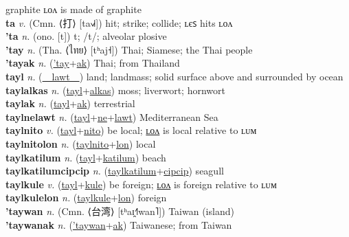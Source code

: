 graphite ʟᴏᴧ is made of graphite \label{tepatolon} \\
\textbf{ta} \textit{v.} (Cmn. ⟨打⟩ [ta˧˩˧])
hit; strike; collide; ʟєꜱ hits ʟᴏᴧ \label{ta} \\
\textbf{'ta} \textit{n.} (ono. [t])
t; /t/; alveolar plosive \label{'ta} \\
\textbf{'tay} \textit{n.} (Tha. ⟨ไทย⟩ [tʰaj˧])
Thai; Siamese; the Thai people \label{'tay} \\
\textbf{'tayak} \textit{n.} (\hyperref['tay]{'tay}+\hyperref[ak]{ak})
Thai; from Thailand \label{'tayak} \\
\textbf{tayl} \textit{n.} (\hyperref[lawt]{~~lawt~~})
land; landmass; solid surface above and surrounded by ocean \label{tayl} \\
\textbf{taylalkas} \textit{n.} (\hyperref[tayl]{tayl}+\hyperref[alkas]{alkas})
moss; liverwort; hornwort \label{taylalkas} \\
\textbf{taylak} \textit{n.} (\hyperref[tayl]{tayl}+\hyperref[ak]{ak})
terrestrial \label{taylak} \\
\textbf{taylnelawt} \textit{n.} (\hyperref[tayl]{tayl}+\hyperref[ne]{ne}+\hyperref[lawt]{lawt})
Mediterranean Sea \label{taylnelawt} \\
\textbf{taylnito} \textit{v.} (\hyperref[tayl]{tayl}+\hyperref[nito]{nito})
be local; \hyperref[taylnitolon]{ʟᴏᴧ} is local relative to ʟᴜᴍ \label{taylnito} \\
\textbf{taylnitolon} \textit{n.} (\hyperref[taylnito]{taylnito}+\hyperref[lon]{lon})
local \label{taylnitolon} \\
\textbf{taylkatilum} \textit{n.} (\hyperref[tayl]{tayl}+\hyperref[katilum]{katilum})
beach \label{taylkatilum} \\
\textbf{taylkatilumcipcip} \textit{n.} (\hyperref[taylkatilum]{taylkatilum}+\hyperref[cipcip]{cipcip})
seagull \label{taylkatilumcipcip} \\
\textbf{taylkule} \textit{v.} (\hyperref[tayl]{tayl}+\hyperref[kule]{kule})
be foreign; \hyperref[taylkulelon]{ʟᴏᴧ} is foreign relative to ʟᴜᴍ \label{taylkule} \\
\textbf{taylkulelon} \textit{n.} (\hyperref[taylkule]{taylkule}+\hyperref[lon]{lon})
foreign \label{taylkulelon} \\
\textbf{'taywan} \textit{n.} (Cmn. ⟨台湾⟩ [tʰaɪ̯˧˥wan˥])
Taiwan (island) \label{'taywan} \\
\textbf{'taywanak} \textit{n.} (\hyperref['taywan]{'taywan}+\hyperref[ak]{ak})
Taiwanese; from Taiwan \label{'taywanak} \\
